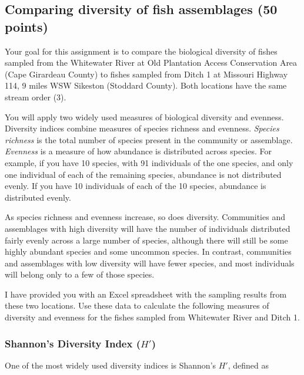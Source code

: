 \documentclass[12pt]{article}
\begin{document}
\thispagestyle{plain}


\subsection*{Comparing diversity of fish assemblages (50 points)}

Your goal for this assignment is to compare the biological diversity of fishes sampled from the Whitewater River at Old Plantation Access Conservation Area (Cape Girardeau County) to fishes sampled from Ditch 1 at Missouri Highway 114, 9 miles WSW Sikeston (Stoddard County). Both locations have the same stream order (3).  

You will apply two widely used measures of biological diversity and evenness. Diversity indices combine measures of species richness and evenness.  \emph{Species richness} is the total number of species present in the community or assemblage.  \emph{Evenness} is a measure of how abundance is distributed across species.  For example, if you have 10 species, with 91 individuals of the one species, and only one individual of each of the remaining species, abundance is not distributed evenly.  If you have 10 individuals of each of the 10 species, abundance is distributed evenly. 

As species richness and evenness increase, so does diversity.  Communities and assemblages with high diversity will have the number of individuals distributed fairly evenly across a large number of species, although there will still be some highly abundant species and some uncommon species.  In contrast, communities and assemblages with low diversity will have fewer species, and most individuals will belong only to a few of those species.

I have provided you with an Excel spreadsheet with the sampling results from these two locations.  Use these data to calculate the following measures of diversity and evenness for the fishes sampled from Whitewater River and Ditch 1. 

\subsubsection*{Shannon's Diversity Index ($H'$)}

One of the most widely used diversity indices is Shannon's $H'$, defined as 
\end{document}
